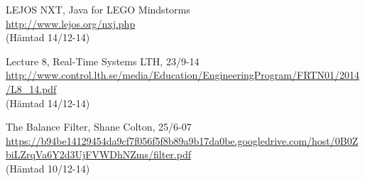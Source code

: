 \documentclass[a4paper]{article}
\begin{document}

\begin{thebibliography}{1}
LEJOS NXT, Java for LEGO Mindstorms\\
\url{http://www.lejos.org/nxj.php}\\
(Hämtad 14/12-14)

Lecture 8, Real-Time Systems LTH, 23/9-14\\
\url{http://www.control.lth.se/media/Education/EngineeringProgram/FRTN01/2014/L8_14.pdf}\\
(Hämtad 14/12-14)

The Balance Filter, Shane Colton, 25/6-07\\
\url{https://b94be14129454da9cf7f056f5f8b89a9b17da0be.googledrive.com/host/0B0ZbiLZrqVa6Y2d3UjFVWDhNZms/filter.pdf}\\
(Hämtad 10/12-14)
\end{thebibliography}
\end{document}
